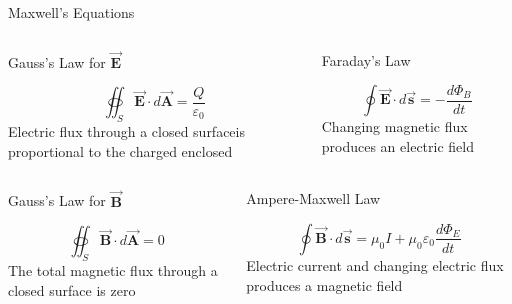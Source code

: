 \documentclass{beamer}
\begin{document}
\begin{frame}{Maxwell's Equations}
    \begin{columns}
    \begin{column}{0.5\textwidth}
        \begin{center}
            Gauss's Law for $\vec{\mathbf{E}}$
        \end{center}
       \[ \oiint_S \vec{\mathbf{E}}\cdot d\vec{\mathbf{A}} = \frac{Q}{\varepsilon_0} \]
       Electric  flux  through  a  closed  surfaceis proportional to the charged enclosed
       \end{column}
       \begin{column}{0.5\textwidth}
        \begin{center}
            Faraday's Law
        \end{center}
        \[ \oint \vec{\mathbf{E}}\cdot d\vec{\mathbf{s}} = -\frac{d\Phi_B}{dt}\]
        Changing  magnetic  flux  produces  an  electric field 
    \end{column}
    \end{columns}
    
    \begin{columns}
    \begin{column}{0.5\textwidth}
        \begin{center}
            Gauss's Law for $\vec{\mathbf{B}}$
        \end{center}
       \[ \oiint_S \vec{\mathbf{B}}\cdot d\vec{\mathbf{A}} = 0 \]
       The   total   magnetic   flux   through   a closed surface is zero 
       \end{column}
       \begin{column}{0.5\textwidth}
        \begin{center}
            Ampere-Maxwell Law
        \end{center}
        \[ \oint \vec{\mathbf{B}}\cdot d\vec{\mathbf{s}} = \mu_0 I + \mu_0\varepsilon_0\frac{d\Phi_E}{dt}\]
        Electric  current  and  changing  electric  flux produces a magnetic field
    \end{column}
    \end{columns}
\end{frame}
\end{document}
